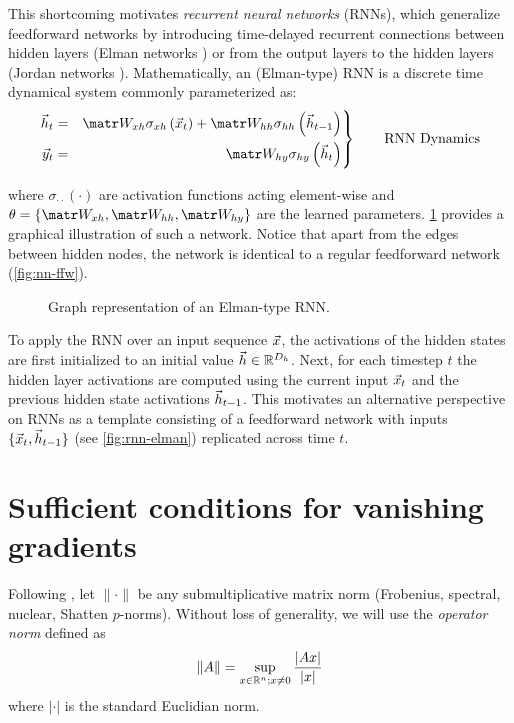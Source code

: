 This shortcoming motivates \emph{recurrent neural networks} (RNNs), which
generalize feedforward networks by introducing time-delayed recurrent
connections between hidden layers (Elman networks \citep{elman1990finding}) or
from the output layers to the hidden layers (Jordan networks
\citep{jordan1997serial}). Mathematically, an (Elman-type) RNN is a discrete time
dynamical system commonly parameterized as:
\begin{equation}
 \left.\begin{aligned}
          \h_t &=& \W_{xh} \sigma_{xh} \left( \x_t \right) + \W_{hh} \sigma_{hh} \left( \h_{t-1} \right)\\
          \y_t &=& \W_{hy} \sigma_{hy} \left( \h_t \right)
       \end{aligned}
 \right\}
 \qquad \text{RNN Dynamics}
\end{equation}
\begin{align}
\end{align}
where $\sigma_{\cdot \cdot}(\cdot)$ are activation functions acting
element-wise and $\theta = \{ \W_{xh}, \W_{hh}, \W_{hy}\}$ are the learned
parameters. \cref{fig:nn-rnn} provides a graphical illustration of such a
network. Notice that apart from the edges between hidden nodes, the network is
identical to a regular feedforward network (\cref{fig:nn-ffw}).


\begin{figure}[tb]
    \centering
    
    \caption{Graph representation of an Elman-type RNN.}
    \label{fig:nn-rnn}
\end{figure}

To apply the RNN over an input sequence $\vec{x}$, the activations of the hidden
states are first initialized to an initial value $\vec{h} \in \mathbb{R}^{D_{h}}$. Next,
for each timestep $t$ the hidden layer activations are computed using the
current input $\vec{x}_t$ and the previous hidden state activations $\vec{h}_{t-1}$.
This motivates an alternative perspective on RNNs as a template consisting
of a feedforward network with inputs $\{\vec{x}_t, \vec{h}_{t-1}\}$ (see
\cref{fig:rnn-elman}) replicated across time $t$.


\section{Sufficient conditions for vanishing gradients}\label{sec:vanishing-exploding-gradients}

Following \citet{Pascanu2012}, let $\| \cdot \|$ be any
submultiplicative matrix norm (\eg Frobenius, spectral, nuclear, Shatten
$p$-norms). Without loss of generality, we will use the \emph{operator norm}
defined as
\begin{equation}\label{eq:operator-norm}
    \| A \| = \sup_{x \in \mathbb{R}^n; x \neq 0} \frac{|A x|}{|x|}
\end{equation}
where $|\cdot|$ is the standard Euclidian norm.

